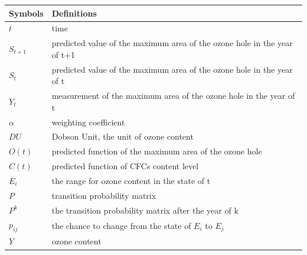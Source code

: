 \documentclass[12pt]{article}
\begin{document}
\begin{tabular}{ll}
\hline
Symbols&Definitions\\
\hline
$t$& time\\
$S_{t+1}$& predicted value of the maximum area of the ozone hole in the year of t+1\\
$S_t$& predicted value of the maximum area of the ozone hole in the year of t\\
$Y_t$& measurement of the maximum area of the ozone hole in the year of t\\
$\alpha$& weighting coefficient\\
$DU$&Dobson Unit, the unit of ozone content\\
$O(t)$& predicted function of the maximum area of the ozone hole\\
$C(t)$& predicted function of CFCs content level\\
$E_i$& the range for ozone content in the state of t\\
$P$& transition probability matrix\\
$P^k$& the transition probability matrix after the year of k\\
$p_{ij}$& the chance to change from the state of $E_i$ to $E_j$\\
$Y$& ozone content\\
\hline
\end{tabular}


\end{document}
